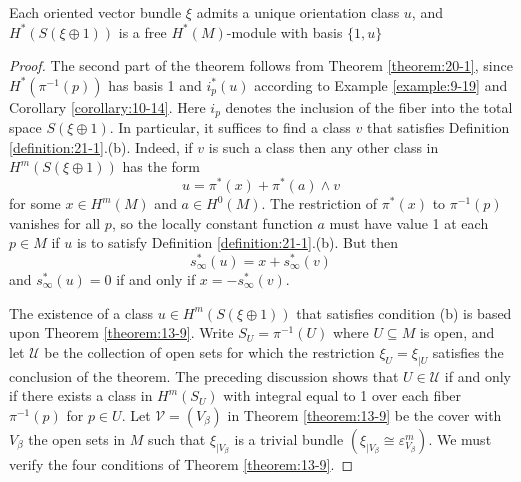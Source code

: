 \begin{theorem}\label{theorem:21-2}
  Each oriented vector bundle $\xi$ admits a unique orientation class $u$, and ${H}^*( {S( {\xi  \oplus  1}) })$ 
  is a free ${H}^*( M)$-module with basis $\{ 1,u\}$
\end{theorem}

\begin{proof}
  The second part of the theorem follows from Theorem \ref{theorem:20-1}, since ${H}^*( {{\pi }^{-1}( p) })$ has basis 1
  and ${i}_{p}^*( u)$ according to Example \ref{example:9-19} and Corollary \ref{corollary:10-14}. Here ${i}_{p}$ denotes 
  the inclusion of the fiber into the total space $S( {\xi  \oplus  1})$. In particular, it suffices to find a class $v$ that 
  satisfies Definition \ref{definition:21-1}.(b). Indeed, if $v$ is such a class then any other class in $H^m( {S( {\xi  \oplus  1}) })$ 
  has the form
  \[
    u = {\pi }^*( x)  + {\pi }^*( a)  \land  v
  \]
  for some $x \in  H^m( M)$ and $a \in  {H}^{0}( M)$. The restriction of ${\pi }^*( x)$ to ${\pi }^{-1}( p)$ 
  vanishes for all $p$, so the locally constant function $a$ must have value 1 at each $p \in  M$ if $u$ is to satisfy 
  Definition \ref{definition:21-1}.(b). But then
  \[
    {s}_{\infty }^*( u)  = x + {s}_{\infty }^*( v)
  \]
  and ${s}_{\infty }^*( u)  = 0$ if and only if $x = - {s}_{\infty }^*( v)$.
  
  The existence of a class $u \in  H^m( {S( {\xi  \oplus  1}) })$ that satisfies condition (b) is based upon 
  Theorem \ref{theorem:13-9}. Write ${S}_{U} = {\pi }^{-1}( U)$ where $U \subseteq  M$ is open, and let $\mathcal{U}$ 
  be the collection of open sets for which the restriction ${\xi }_{U} = {\xi }_{\mid U}$ satisfies the conclusion
  of the theorem. The preceding discussion shows that $U \in  \mathcal{U}$ if and only if there exists a class 
  in $H^m( {S}_{U})$ with integral equal to 1 over each fiber ${\pi }^{-1}( p)$ for $p \in  U$. Let $\mathcal{V} = ( {V}_{\beta })$ 
  in Theorem \ref{theorem:13-9} be the cover with ${V}_{\beta }$ the open sets in $M$ such that ${\xi }_{\mid {V}_{\beta }}$ is a 
  trivial bundle $( {{\xi }_{\mid {V}_{\beta }} \cong  {\varepsilon }_{{V}_{\beta }}^{m}})$. We must verify the four 
  conditions of Theorem \ref{theorem:13-9}.


\end{proof}
